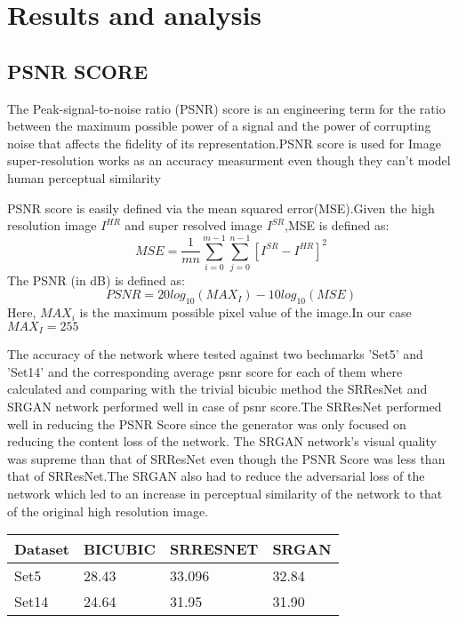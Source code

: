 \chapter{Results and analysis}

\section{PSNR SCORE}
The Peak-signal-to-noise ratio (PSNR) score is an engineering term for the ratio between the maximum possible power of a signal and the power of corrupting noise that affects the fidelity of its representation.PSNR score is used for Image super-resolution works as an accuracy measurment even though they can't model human perceptual similarity

PSNR score is easily defined via the mean squared error(MSE).Given the high resolution image $I^{HR}$ and super resolved image $I^{SR}$,MSE is defined as:
\begin{equation}
MSE = \frac{1}{mn}\sum_{i=0}^{m-1}\sum_{j=0}^{n-1}{[I^{SR} - I^{HR}]}^2
\end{equation}
The PSNR (in dB) is defined as:
\begin{equation}
PSNR = 20 log_{10}(MAX_I) - 10 log_{10}(MSE)
\end{equation}
Here, $MAX_i$ is the maximum possible pixel value of the image.In our case $MAX_I = 255$ 

The accuracy of the network where tested against two bechmarks 'Set5' and 'Set14' and the corresponding average psnr score for each of them where calculated and comparing with the trivial bicubic method the SRResNet and SRGAN network performed well in case of psnr score.The SRResNet performed well in reducing the PSNR Score since the generator was only focused on reducing the content loss of the network. The SRGAN network's visual quality was supreme than that of SRResNet even though the PSNR Score was less than that of SRResNet.The SRGAN also had to reduce the adversarial loss of the network which led to an increase in perceptual similarity of the network to that of the original high resolution image.
\begin{center}
\begin{tabular}{|m{3cm} | m{3cm} | m{3cm} |m{3cm}|}
 \hline
 \textbf{Dataset} & \textbf{BICUBIC} & \textbf{SRRESNET} & \textbf{SRGAN}\\
 \hline
 Set5 &28.43&33.096&32.84 \\
\hline
 Set14 &24.64 &31.95 &31.90 \\
 \hline
\end{tabular}
\end{center}
